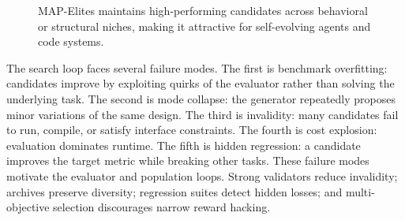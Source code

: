 \begin{figure}[t]
\centering
{}
\caption{MAP-Elites maintains high-performing candidates across behavioral or structural niches, making it attractive for self-evolving agents and code systems.}
\label{alg:map-elites}
\end{figure}

The search loop faces several failure modes.  The first is benchmark overfitting: candidates improve by exploiting quirks of the evaluator rather than solving the underlying task.  The second is mode collapse: the generator repeatedly proposes minor variations of the same design.  The third is invalidity: many candidates fail to run, compile, or satisfy interface constraints.  The fourth is cost explosion: evaluation dominates runtime.  The fifth is hidden regression: a candidate improves the target metric while breaking other tasks.  These failure modes motivate the evaluator and population loops.  Strong validators reduce invalidity; archives preserve diversity; regression suites detect hidden losses; and multi-objective selection discourages narrow reward hacking.

